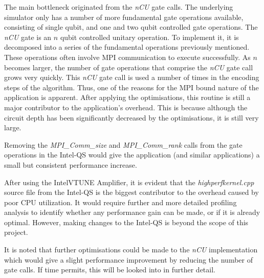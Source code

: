 The main bottleneck originated from the \textit{nCU} gate calls. The underlying simulator only has a number of more fundamental gate operations available, consisting of single qubit, and one and two qubit controlled gate operations. The \textit{nCU} gate is an $n$ qubit controlled unitary operation. To implement it, it is decomposed into a series of the fundamental operations previously mentioned. These operations often involve MPI communication to execute successfully. As $n$ becomes larger, the number of gate operations that comprise the \textit{nCU} gate call grows very quickly. This \textit{nCU} gate call is used a number of times in the encoding steps of the algorithm. Thus, one of the reasons for the MPI bound nature of the application is apparent. After applying the optimisations, this routine is still a major contributor to the application's overhead. This is because although the circuit depth has been significantly decreased by the optimisations, it is still very large.

Removing the \textit{MPI\_Comm\_size} and \textit{MPI\_Comm\_rank} calls from the gate operations in the Intel\textregistered-QS would give the application (and similar applications) a small but consistent performance increase.

After using the Intel{\textregistered}VTUNE Amplifier, it is evident that the \textit{highperfkernel.cpp} source file from the Intel\textregistered-QS is the biggest contributor to the overhead caused by poor CPU utilization. It would require further and more detailed profiling analysis to identify whether any performance gain can be made, or if it is already optimal. However, making changes to the Intel\textregistered-QS is beyond the scope of this project.

It is noted that further optimisations could be made to the \textit{nCU} implementation which would give a slight performance improvement by reducing the number of gate calls. If time permits, this will be looked into in further detail.
